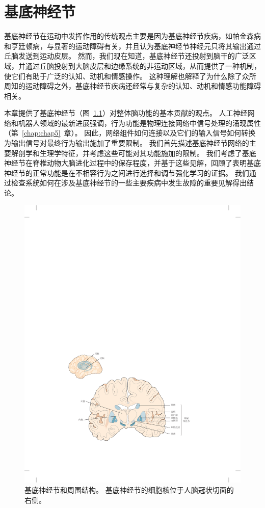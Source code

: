 \chapter{基底神经节} \label{chap:chap38}

基底神经节在运动中发挥作用的传统观点主要是因为基底神经节疾病，如帕金森病和亨廷顿病，与显著的运动障碍有关，并且认为基底神经节神经元只将其输出通过丘脑发送到运动皮层。
然而，我们现在知道，基底神经节还投射到脑干的广泛区域，并通过丘脑投射到大脑皮层和边缘系统的非运动区域，从而提供了一种机制，使它们有助于广泛的认知、动机和情感操作。
这种理解也解释了为什么除了众所周知的运动障碍之外，基底神经节疾病还经常与复杂的认知、动机和情感功能障碍相关。


本章提供了基底神经节（图~\ref{fig:38_1}）对整体脑功能的基本贡献的观点。
人工神经网络和机器人领域的最新进展强调，行为功能是物理连接网络中信号处理的涌现属性（第~\ref{chap:chap5}~章）。
因此，网络组件如何连接以及它们的输入信号如何转换为输出信号对最终行为输出施加了重要限制。
我们首先描述基底神经节网络的主要解剖学和生理学特征，并考虑这些可能对其功能施加的限制。
我们考虑了基底神经节在脊椎动物大脑进化过程中的保存程度，并基于这些见解，回顾了表明基底神经节的正常功能是在不相容行为之间进行选择和调节强化学习的证据。
我们通过检查系统如何在涉及基底神经节的一些主要疾病中发生故障的重要见解得出结论。


\begin{figure}[htbp]
	\centering
	\includegraphics[width=1.0\linewidth]{chap38/fig_38_1}
	\caption{基底神经节和周围结构。
		基底神经节的细胞核位于人脑冠状切面的右侧\cite{nieuwenhuys2007human}。}
	\label{fig:38_1}
\end{figure}



